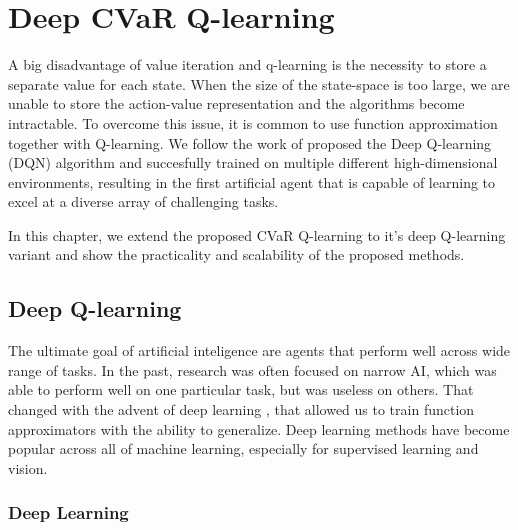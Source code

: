 \chapter{Deep CVaR Q-learning}\label{ch:dqn}

A big disadvantage of value iteration and q-learning is the necessity to store a separate value for each state. When the size of the state-space is too large, we are unable to store the action-value representation and the algorithms become intractable. To overcome this issue, it is common to use function approximation together with Q-learning. We follow the work of \citet{mnih2015human} proposed the Deep Q-learning (DQN) algorithm and succesfully trained on multiple different high-dimensional environments, resulting in the first artificial agent that is capable of learning to excel at a diverse array of challenging tasks.

In this chapter, we extend the proposed CVaR Q-learning to it's deep Q-learning variant and show the practicality and scalability of the proposed methods.

\section{Deep Q-learning}
The ultimate goal of artificial inteligence are agents that perform well across wide range of tasks. In the past, research was often focused on narrow AI, which was able to perform well on one particular task, but was useless on others. That changed with the advent of deep learning \cite{neco}, that allowed us to train function approximators with the ability to generalize. Deep learning methods have become popular across all of machine learning, especially for supervised learning and vision.

\subsection{Deep Learning}

